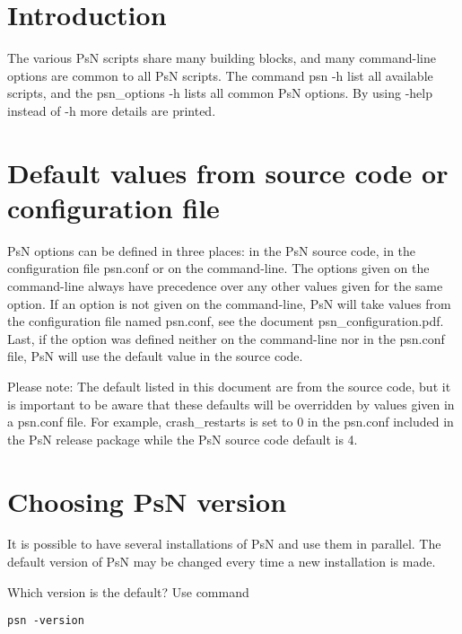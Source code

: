 



\maketitle

\section{Introduction}
The various PsN scripts share many building blocks, and many command-line options are common to all PsN scripts. The command psn -h list all available scripts, and the psn\_options -h lists all common PsN options. By using -help instead of -h more details are printed. 

\section{Default values from source code or configuration file}
PsN options can be defined in three places: in the PsN source code, in the configuration file psn.conf or on the command-line. The options given on the command-line always have precedence over any other values given for the same option. If an option is not given on the command-line, PsN will take values from the configuration file named psn.conf, see the document psn\_configuration.pdf. Last, if the option was defined neither on the command-line nor in the psn.conf file, PsN will use the default value in the source code. 

Please note: The default listed in this document are from the source code, but it is important to be aware that these defaults will be overridden by values given in a psn.conf file. For example, crash\_restarts is set to 0 in the psn.conf included in the PsN release package while the PsN source code default is 4. 

\section{Choosing PsN version}
It is possible to have several installations of PsN and use them in parallel. The default version of PsN may be changed every time a new installation is made. 

Which version is the default? Use command
\begin{verbatim}
psn -version
\end{verbatim}

